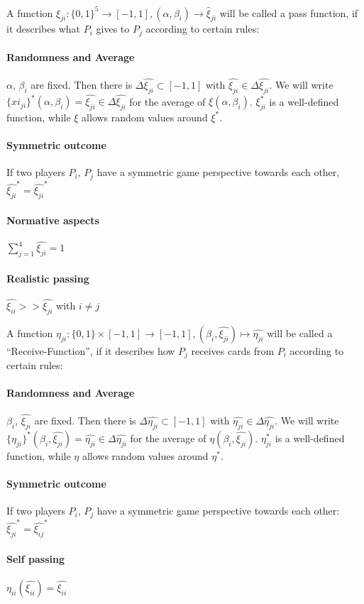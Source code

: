\begin{definition}
A function $\xi_{ji} : \{0,1\}^5 \to [-1,1], (\alpha, \beta_i) \to \hat{\xi}_{ji}$ will be called a pass function, if it describes what $P_i$ gives to $P_j$ according to certain rules:
\paragraph{Randomness and Average}
$\alpha$, $\beta_i$ are fixed. Then there is $\Delta  \hat{\xi_{ji}} \subset [-1,1]$ with  $\hat{\xi_{ji}} \in \Delta  \hat{\xi_{ji}}$. We will write $\{xi_{ji}\}^* (\alpha, \beta_i) =  \hat{\xi_{ji}} \in \Delta  \hat{\xi_{ji}}$ for the average of $\xi(\alpha, \beta_i)$. $\xi_{ji}^*$ is a well-defined function, while $\xi$ allows random values around $\xi^*$.
\paragraph{Symmetric outcome}
If two players $P_i$, $P_j$ have a symmetric game perspective towards each other,  $\hat{\xi_{ji}}^* =  \hat{\xi_{ji}}^*$
\paragraph{Normative aspects}
$\sum_{j = 1}^4 \hat{\xi_{ji}} = 1$
\paragraph{Realistic passing}
$\hat{\xi_{ii}} >>  \hat{\xi_{ji}}$ with $ i \neq j $
\end{definition}
\begin{definition}
A function $\eta_{ji}: \{0,1\} \times [-1,1] \to [-1,1], (\beta_i,  \hat{\xi_{ji}}) \mapsto \hat{\eta_{ji}}$ will be
called a “Receive-Function”, if it describes how $P_j$ receives cards from $P_i$ according to certain rules:
\paragraph{Randomness and Average}
$\beta_i$, $\hat{\xi_{ji}}$ are fixed. Then there is $\Delta  \hat{\eta_{ji}} \subset [-1,1]$ with  $\hat{\eta_{ji}} \in \Delta  \hat{\eta_{ji}}$. We will write $\{\eta_{ji}\}^* (\beta_i, \hat{\xi_{ji}}) =  \hat{\eta_{ji}} \in \Delta  \hat{\eta_{ji}}$ for the average of $\eta(\beta_i, \hat{\xi_{ji}})$. $\eta_{ji}^*$ is a well-defined function, while $\eta$ allows random values around $\eta^*$.
\paragraph{Symmetric outcome}
If two players $P_i$, $P_j$ have a symmetric game perspective towards each other:  $\hat{\xi_{ji}}^* =  \hat{\xi_{ij}}^*$
\paragraph{Self passing}
$\eta_{ii}(\hat{\xi_{ii}}) = \hat{\xi_{ii}} $
\end{definition}
